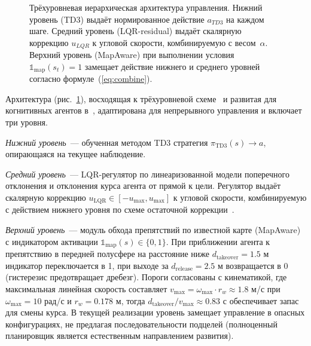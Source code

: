 \documentclass[11pt]{article}
\begin{document}
\begin{figure}[!htb]
{}
\caption{Трёхуровневая иерархическая архитектура управления.
Нижний уровень (TD3) выдаёт нормированное действие $a_{TD3}$ на каждом
шаге. Средний уровень (LQR-residual) выдаёт скалярную коррекцию $u_{LQR}$
к угловой скорости, комбинируемую с весом~$\alpha$. Верхний уровень (MapAware) при выполнении условия $\mathbb{1}_{\mathrm{map}}(s_t) = 1$ замещает действие нижнего и среднего уровней согласно формуле~(\ref{eq:combine}).}
\label{fig:strl_arch}
\end{figure}

Архитектура (рис.~\ref{fig:strl_arch}), восходящая к трёхуровневой схеме~\cite{gat1998three} и развитая для когнитивных агентов в~\cite{kiselev2020dissertation,kiselev2020}, адаптирована для непрерывного управления и включает три уровня.

\textit{Нижний уровень}~--- обученная методом TD3 стратегия $\pi_{\mathrm{TD3}}(s) \to a$, опирающаяся на текущее наблюдение.

\textit{Средний уровень}~--- LQR-регулятор по линеаризованной модели поперечного отклонения и отклонения курса агента от прямой к цели. Регулятор выдаёт скалярную коррекцию $u_{\mathrm{LQR}} \in [-u_{\max}, u_{\max}]$ к угловой скорости, комбинируемую с действием нижнего уровня по схеме остаточной коррекции~\cite{silver2018residual,johannink2019residual}.

\textit{Верхний уровень}~--- модуль обхода препятствий по известной карте (MapAware) с индикатором активации $\mathbb{1}_{\mathrm{map}}(s) \in \{0, 1\}$. При приближении агента к препятствию в передней полусфере на расстояние ниже $d_{\mathrm{takeover}} = 1.5$ м индикатор переключается в 1, при выходе за $d_{\mathrm{release}} = 2.5$ м возвращается в 0 (гистерезис предотвращает дребезг). Пороги согласованы с кинематикой, где максимальная линейная скорость составляет $v_{\max} = \omega_{\max} \cdot r_w \approx 1.8$ м/с при $\omega_{\max} = 10$ рад/с и $r_w = 0.178$ м, тогда $d_{\mathrm{takeover}} / v_{\max} \approx 0.83$ с обеспечивает запас для смены курса. В текущей реализации уровень замещает управление в опасных конфигурациях, не предлагая последовательности подцелей (полноценный планировщик является естественным направлением развития).
\end{document}

